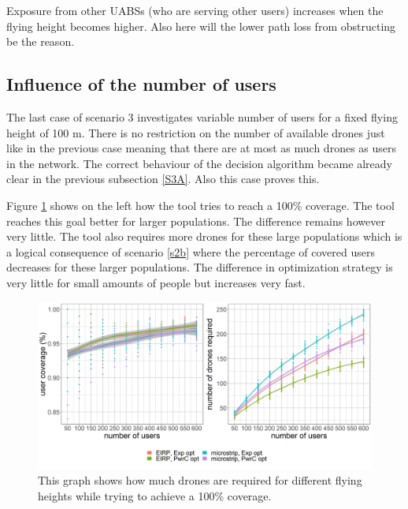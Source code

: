 Exposure from other \gls{UABS}s (who are serving  other users) increases when the flying height becomes higher. 
Also here will the lower path loss from obstructing be the reason.

\FloatBarrier
\subsection{Influence of the number of users}
\label{S3B}

The last case of scenario 3 investigates variable number of users for a fixed flying height of 100 m. There is no 
restriction on the number of available drones just like in the previous case meaning that there are at most 
as much drones as users in the network. The correct behaviour of the decision algorithm became already clear in the previous subsection \ref{S3A}. 
Also this case proves this.

Figure \ref{fig:s3b_numDronesAndCov} shows on the left how the tool tries to reach a 100\% coverage. The tool reaches this goal 
better for larger populations. The difference remains however very little. The tool also requires more drones for these large 
populations which is a logical consequence of scenario \ref{s2b} where the percentage of covered users decreases for these larger populations.
 The difference in optimization strategy is very little for small amounts of people but increases very fast. 

\begin{figure}[h!]
  \includegraphics[width=\textwidth]{../results/s3/uvsnumdronesAndCov.png}
  \caption{This graph shows how much drones are required for different flying heights while trying to achieve a 100\% coverage.}
  \label{fig:s3b_numDronesAndCov}
\end{figure}

